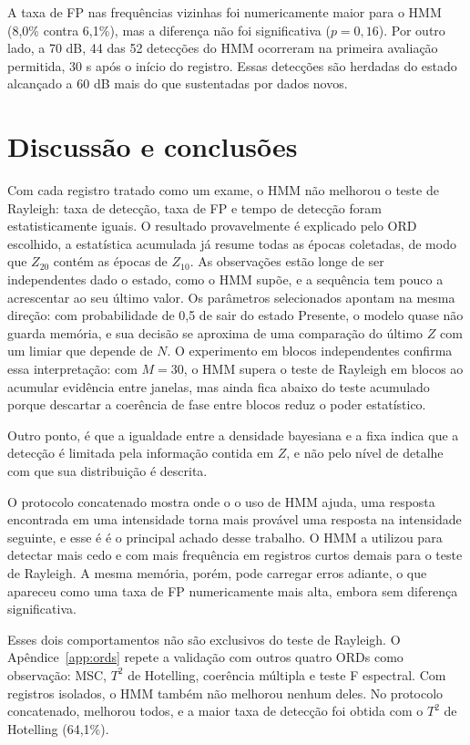 \documentclass[conference]{IEEEtran}
\begin{document}
A taxa de FP nas frequências vizinhas foi numericamente maior para o HMM (8,0\% contra 6,1\%), mas a diferença não foi significativa ($p=0{,}16$). Por outro lado, a 70 dB, 44 das 52 detecções do HMM ocorreram na primeira avaliação permitida, 30 s após o início do registro. Essas detecções são herdadas do estado alcançado a 60 dB mais do que sustentadas por dados novos.

\section{Discussão e conclusões}

Com cada registro tratado como um exame, o HMM não melhorou o teste de Rayleigh: taxa de detecção, taxa de FP e tempo de detecção foram estatisticamente iguais. O resultado provavelmente é explicado pelo ORD escolhido, a estatística acumulada já resume todas as épocas coletadas, de modo que $Z_{20}$ contém as épocas de $Z_{10}$. As observações estão longe de ser independentes dado o estado, como o HMM supõe, e a sequência tem pouco a acrescentar ao seu último valor. Os parâmetros selecionados apontam na mesma direção: com probabilidade de 0,5 de sair do estado Presente, o modelo quase não guarda memória, e sua decisão se aproxima de uma comparação do último $Z$ com um limiar que depende de $N$. O experimento em blocos independentes confirma essa interpretação: com $M=30$, o HMM supera o teste de Rayleigh em blocos ao acumular evidência entre janelas, mas ainda fica abaixo do teste acumulado porque descartar a coerência de fase entre blocos reduz o poder estatístico.

Outro ponto, é que a igualdade entre a densidade bayesiana e a fixa indica que a detecção é limitada pela informação contida em $Z$, e não pelo nível de detalhe com que sua distribuição é descrita.

O protocolo concatenado mostra onde o o uso de HMM ajuda, uma resposta encontrada em uma intensidade torna mais provável uma resposta na intensidade seguinte, e esse é é o principal achado desse trabalho. O HMM a utilizou para detectar mais cedo e com mais frequência em registros curtos demais para o teste de Rayleigh. A mesma memória, porém, pode carregar erros adiante, o que apareceu como uma taxa de FP numericamente mais alta, embora sem diferença significativa.

Esses dois comportamentos não são exclusivos do teste de Rayleigh. O Apêndice~\ref{app:ords} repete a validação com outros quatro ORDs como observação: MSC, $T^2$ de Hotelling, coerência múltipla e teste F espectral. Com registros isolados, o HMM também não melhorou nenhum deles. No protocolo concatenado, melhorou todos, e a maior taxa de detecção foi obtida com o $T^2$ de Hotelling (64,1\%).
\end{document}
